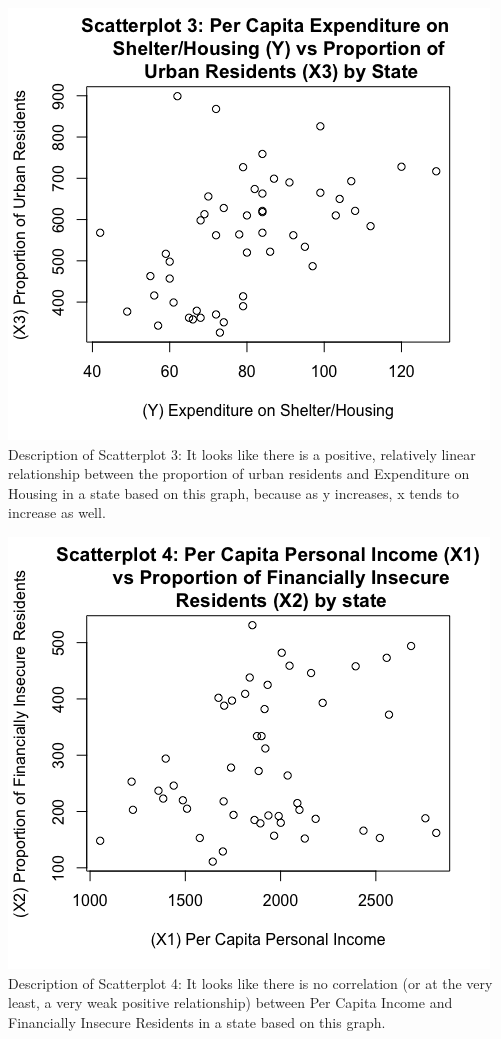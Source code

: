 \documentclass[12pt,letterpaper]{article}
\begin{document}
\begin{itemize}
		\newpage	
		 
		
		\begin{center}
		\includegraphics[scale=.80]{Scatterplot3.png}
		Description of Scatterplot 3: It looks like there is a positive, relatively linear relationship between the proportion of urban residents and Expenditure on Housing in a state based on this graph, because as y increases, x tends to increase as well. 
		\end{center}
	
		\newpage	
		 
		
		\begin{center}
		\includegraphics[scale=.80]{Scatterplot4.png}
		Description of Scatterplot 4: It looks like there is no correlation (or at the very least, a very weak positive relationship) between Per Capita Income and Financially Insecure Residents in a state based on this graph.
		\end{center}
	

\end{itemize}
\end{document}
